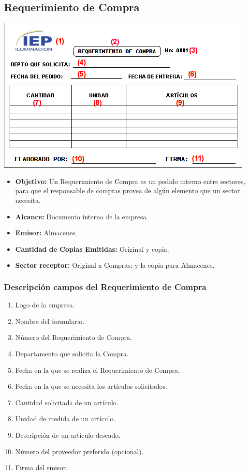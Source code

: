 \pagebreak
\subsection{Requerimiento de Compra}
\begin{center}
 \includegraphics{Images/FormulariosIEP/Requerimiento-de-Compra.png}
\end{center}

\begin{itemize}
  \item \textbf{Objetivo:} Un Requerimiento de Compra es un pedido interno entre sectores, para que el responsable de compras provea de algún elemento que un sector necesita.
  \item \textbf{Alcance:} Documento interno de la empresa.
  \item \textbf{Emisor:} Almacenes.
  \item \textbf{Cantidad de Copias Emitidas:} Original y copia.
  \item \textbf{Sector receptor:} Original a Compras; y la copia para Almacenes.
 \end{itemize}
\subsubsection{Descripci\'on campos del Requerimiento de Compra}
\begin{enumerate}
 \item Logo de la empresa.
 \item Nombre del formulario.
 \item N\'umero del Requerimiento de Compra.
 \item Departamento que solicita la Compra.
 \item Fecha en la que se realiza el Requerimiento de Compra.
 \item Fecha en la que se necesita los art\'iculos solicitados.
 \item Cantidad solicitada de un art\'iculo.
 \item Unidad de medida de un art\'iculo.
 \item Descripci\'on de un art\'iculo deseado.
 \item N\'umero del proveedor preferido (opcional).
 \item Firma del emisor.
\end{enumerate}


